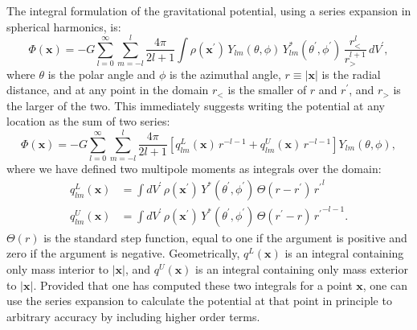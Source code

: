 \documentclass[iop]{../emulateapj}
\begin{document}
The integral formulation of the gravitational potential, using a series expansion in spherical harmonics, is:
\begin{equation}
  \Phi(\mathbf{x}) = -G\sum_{l=0}^{\infty} \sum_{m=-l}^{l} \frac{4\pi}{2l+1} \int \rho(\mathbf{x}^\prime)\, Y_{lm}(\theta,\phi)\, Y_{lm}^*(\theta^\prime,\phi^\prime)\, \frac{r_{<}^{l}}{r_{>}^{l+1}}\, dV^\prime,
\end{equation}
where $\theta$ is the polar angle and $\phi$ is the azimuthal angle, $r \equiv |\mathbf{x}|$ is the radial distance, and at any point in the domain $r_{<}$ is the smaller of $r$ and $r^\prime$, and $r_{>}$ is the larger of the two. This immediately suggests writing the potential at any location as the sum of
two series:
\begin{equation*}
  \Phi(\mathbf{x}) = -G\sum_{l=0}^{\infty} \sum_{m=-l}^{l} \frac{4\pi}{2l+1}\left[ q^{L}_{lm}(\mathbf{x})\, r^{-l-1} + q^{U}_{lm}(\mathbf{x})\, r^{-l-1} \right] Y_{lm}(\theta,\phi),
\end{equation*}
where we have defined two multipole moments as integrals over the domain:
\begin{align}
  q^{L}_{lm}(\mathbf{x}) &= \int dV^\prime\, \rho(\mathbf{x}^\prime)\, Y^*(\theta^\prime,\phi^\prime)\, \Theta(r - r^\prime)\, {r^\prime}^{l} \\
  q^{U}_{lm}(\mathbf{x}) &= \int dV^\prime\, \rho(\mathbf{x}^\prime)\, Y^*(\theta^\prime,\phi^\prime)\, \Theta(r^\prime - r)\, {r^\prime}^{-l-1}.
\end{align}
$\Theta(r)$ is the standard step function, equal to one if the argument is positive and zero if the argument is negative. Geometrically,
$q^{L}(\mathbf{x})$ is an integral containing only mass interior to $|\mathbf{x}|$, and $q^{U}(\mathbf{x})$ is an integral containing only
mass exterior to $|\mathbf{x}|$. Provided that one has computed these two integrals for a point $\mathbf{x}$, one can use the series expansion
to calculate the potential at that point in principle to arbitrary accuracy by including higher order terms.
  
\end{document}
